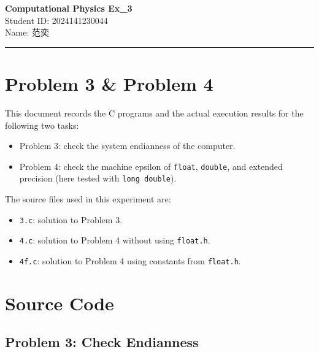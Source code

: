 \documentclass[12pt,a4paper]{article}
\newcommand{\HomeworkTitle}{Computational Physics Ex\_3}
\newcommand{\StudentID}{2024141230044}
\newcommand{\StudentName}{范奕}
\begin{document}
\begin{center}
    {\LARGE \textbf{\HomeworkTitle}}\\[1.2em]
    {\large Student ID: \StudentID}\\[0.5em]
    {\large Name: \StudentName}
\end{center}

\vspace{0.5em}
\noindent\rule{\textwidth}{0.8pt}
\vspace{0.5em}

\section*{Problem 3 \& Problem 4}

This document records the C programs and the actual execution results for the following two tasks:
\begin{itemize}
    \item Problem 3: check the system endianness of the computer.
    \item Problem 4: check the machine epsilon of \texttt{float}, \texttt{double}, and extended precision (here tested with \texttt{long double}).
\end{itemize}

The source files used in this experiment are:
\begin{itemize}
    \item \texttt{3.c}: solution to Problem 3.
    \item \texttt{4.c}: solution to Problem 4 without using \texttt{float.h}.
    \item \texttt{4f.c}: solution to Problem 4 using constants from \texttt{float.h}.
\end{itemize}

\newpage
\tableofcontents
\newpage

\section{Source Code}

\subsection{Problem 3: Check Endianness}
\end{document}

